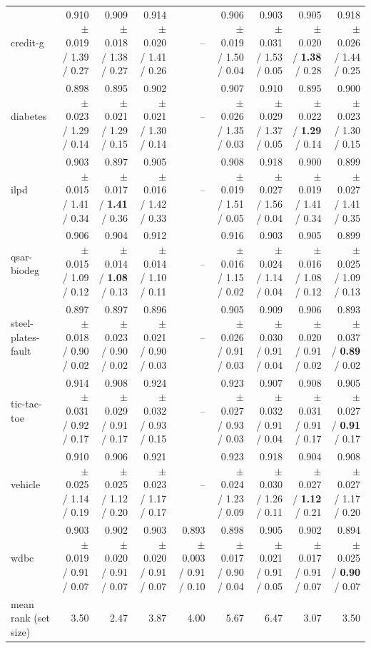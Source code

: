 \begin{table}[t]
\begin{tabular}{lrrrrrrrr}
credit-g & 0.910$\pm$0.019 / 1.39 / 0.27 & 0.909$\pm$0.018 / 1.38 / 0.27 & 0.914$\pm$0.020 / 1.41 / 0.26 & -- & 0.906$\pm$0.019 / 1.50 / 0.04 & 0.903$\pm$0.031 / 1.53 / 0.05 & 0.905$\pm$0.020 / \textbf{1.38} / 0.28 & 0.918$\pm$0.026 / 1.44 / 0.25 \\
diabetes & 0.898$\pm$0.023 / 1.29 / 0.14 & 0.895$\pm$0.021 / 1.29 / 0.15 & 0.902$\pm$0.021 / 1.30 / 0.14 & -- & 0.907$\pm$0.026 / 1.35 / 0.03 & 0.910$\pm$0.029 / 1.37 / 0.05 & 0.895$\pm$0.022 / \textbf{1.29} / 0.14 & 0.900$\pm$0.023 / 1.30 / 0.15 \\
ilpd & 0.903$\pm$0.015 / 1.41 / 0.34 & 0.897$\pm$0.017 / \textbf{1.41} / 0.36 & 0.905$\pm$0.016 / 1.42 / 0.33 & -- & 0.908$\pm$0.019 / 1.51 / 0.05 & 0.918$\pm$0.027 / 1.56 / 0.04 & 0.900$\pm$0.019 / 1.41 / 0.34 & 0.899$\pm$0.027 / 1.41 / 0.35 \\
qsar-biodeg & 0.906$\pm$0.015 / 1.09 / 0.12 & 0.904$\pm$0.014 / \textbf{1.08} / 0.13 & 0.912$\pm$0.014 / 1.10 / 0.11 & -- & 0.916$\pm$0.016 / 1.15 / 0.02 & 0.903$\pm$0.024 / 1.14 / 0.04 & 0.905$\pm$0.016 / 1.08 / 0.12 & 0.899$\pm$0.025 / 1.09 / 0.13 \\
steel-plates-fault & 0.897$\pm$0.018 / 0.90 / 0.02 & 0.897$\pm$0.023 / 0.90 / 0.02 & 0.896$\pm$0.021 / 0.90 / 0.03 & -- & 0.905$\pm$0.026 / 0.91 / 0.03 & 0.909$\pm$0.030 / 0.91 / 0.04 & 0.906$\pm$0.020 / 0.91 / 0.02 & 0.893$\pm$0.037 / \textbf{0.89} / 0.02 \\
tic-tac-toe & 0.914$\pm$0.031 / 0.92 / 0.17 & 0.908$\pm$0.029 / 0.91 / 0.17 & 0.924$\pm$0.032 / 0.93 / 0.15 & -- & 0.923$\pm$0.027 / 0.93 / 0.03 & 0.907$\pm$0.032 / 0.91 / 0.04 & 0.908$\pm$0.031 / 0.91 / 0.17 & 0.905$\pm$0.027 / \textbf{0.91} / 0.17 \\
vehicle & 0.910$\pm$0.025 / 1.14 / 0.19 & 0.906$\pm$0.025 / 1.12 / 0.20 & 0.921$\pm$0.023 / 1.17 / 0.17 & -- & 0.923$\pm$0.024 / 1.23 / 0.09 & 0.918$\pm$0.030 / 1.26 / 0.11 & 0.904$\pm$0.027 / \textbf{1.12} / 0.21 & 0.908$\pm$0.027 / 1.17 / 0.20 \\
wdbc & 0.903$\pm$0.019 / 0.91 / 0.07 & 0.902$\pm$0.020 / 0.91 / 0.07 & 0.903$\pm$0.020 / 0.91 / 0.07 & 0.893$\pm$0.003 / 0.91 / 0.10 & 0.898$\pm$0.017 / 0.90 / 0.04 & 0.905$\pm$0.021 / 0.91 / 0.05 & 0.902$\pm$0.017 / 0.91 / 0.07 & 0.894$\pm$0.025 / \textbf{0.90} / 0.07 \\
\midrule mean rank (set size) & 3.50 & 2.47 & 3.87 & 4.00 & 5.67 & 6.47 & 3.07 & 3.50 \\
\bottomrule
\end{tabular}
\end{table}

